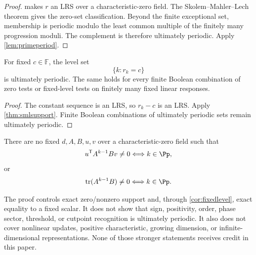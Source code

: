 \begin{proof}
 makes \(r\) an LRS over a characteristic-zero field.
The Skolem--Mahler--Lech theorem
\citep{Lech1953,Bell2006,Bell2008Corrigendum} gives the zero-set
classification.  Beyond the finite exceptional set, membership is periodic
modulo the least common multiple of the finitely many progression moduli.
The complement is therefore ultimately periodic.  Apply
\cref{lem:primeperiod}.
\end{proof}

\begin{corollary}
\label{cor:fixedlevel}
For fixed \(c\in\mathbb F\), the level set
\[
        \{k:r_k=c\}
\]
is ultimately periodic.  The same holds for every finite Boolean
combination of zero tests or fixed-level tests on finitely many fixed
linear responses.
\end{corollary}

\begin{proof}
The constant sequence is an LRS, so \(r_k-c\) is an LRS.  Apply
\cref{thm:smlsupport}.  Finite Boolean combinations of ultimately periodic
sets remain ultimately periodic.
\end{proof}

\begin{corollary}
\label{cor:noprimecoefficient}
There are no fixed \(d,A,B,u,v\) over a characteristic-zero field such that
\[
 u^{\mathsf T}A^{k-1}Bv\ne0
 \Longleftrightarrow k\in\Pp,
\]
or
\[
 \operatorname{tr}(A^{k-1}B)\ne0
 \Longleftrightarrow k\in\Pp.
\]
\end{corollary}

\begin{remark}
\label{rem:smlfirewall}
The proof controls exact zero/nonzero support and, through
\cref{cor:fixedlevel}, exact equality to a fixed scalar.  It does not show
that sign, positivity, order, phase sector, threshold, or cutpoint
recognition is ultimately periodic.  It also does not cover nonlinear
updates, positive characteristic, growing dimension, or
infinite-dimensional representations.  None of those stronger statements
receives credit in this paper.
\end{remark}

